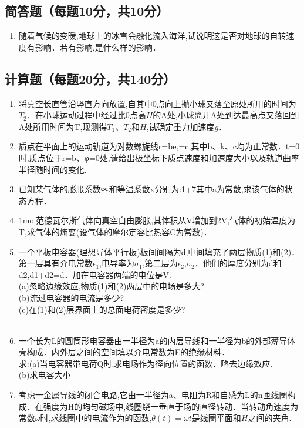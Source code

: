 
\subsection{简答题（每题10分，共10分）}
\begin{enumerate}
\item 随着气候的变暖,地球上的冰雪会融化流入海洋,试说明这是否对地球的自转速度有影响．若有影响,是什么样的影响．
\end{enumerate}
\subsection{计算题（每题20分，共140分）}
\begin{enumerate}
\item 将真空长直管沿竖直方向放置,自其中0点向上抛小球又落至原处所用的时间为$T_2$．在小球运动过程中经过比0点高$H$的$\mathrm A$处,小球离开$\mathrm A$处到达最高点又落回到$\mathrm A$处所用时间为T,现测得$T_1$、$T_2$和$H$,试确定重力加速度$g$．
\item 质点在平面上的运动轨道为对数螺旋线r=be,=c,其中b、k、c均为正常数．t=0时,质点位于r=b、φ=0处,请给出极坐标下质点速度和加速度大小以及轨道曲率半径随时间的变化.
\item 已知某气体的膨胀系数∝和等温系数x分别为:1+7其中a为常数,求该气体的状态方程．
\item 1mol范德瓦尔斯气体向真空自由膨胀,其体积从V增加到2V,气体的初始温度为T,求气体的熵变(设气体的摩尔定容比热容C为常数)．
\item 一个平板电容器(理想导体平行板)板间间隔为d,中间填充了两层物质(1)和(2)．第一层具有介电常数$\epsilon_1$,电导率为$\sigma_1$,第二层为$\epsilon_2$,$\sigma_2$．他们的厚度分别为d和d2,d1+d2=d．加在电容器两端的电位是V.\\
(a)忽略边缘效应,物质(1)和(2)两层中的电场是多大?\\
(b)流过电容器的电流是多少?\\
(c)在(1)和(2)层界面上的总面电荷密度是多少?\\
\\
\item 一个长为L的圆筒形电容器由一半径为a的内层导线和一半径为b的外部薄导体壳构成．内外层之间的空间填以介电常数为E的绝缘材料．\\
求:(a)当电容器带电荷Q时,求电场作为径向位置的函数．略去边缘效应.\\
(b)求电容大小
\item 考虑一金属导线的闭合电路,它由一半径为a、电阻为R和自感为L的n匝线圈构成．在强度为H的均匀磁场中,线圈绕一垂直于场的直径转动．当转动角速度为常数$\omega$时,求线圈中的电流作为的函数,$\theta (t)=\omega t$是线圈平面和$H$之间的夹角.

\end{enumerate}